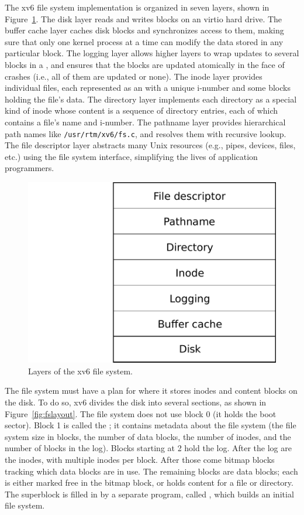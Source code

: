 The xv6 file system implementation is
organized in seven layers, shown in 
Figure~\ref{fig:fslayer}.
The disk layer reads and writes blocks on an virtio hard drive.
The buffer cache layer caches disk blocks and synchronizes access to them,
making sure that only one kernel process at a time can modify the
data stored in any particular block.  The logging layer allows higher
layers to wrap updates to several blocks in a
,
and ensures that the blocks are updated atomically in the
face of crashes (i.e., all of them are updated or none).
The inode layer provides individual files, each represented as an
with a unique i-number
and some blocks holding the file's data.  The directory
layer implements each directory as a special kind of
inode whose content is a sequence of directory entries, each of which contains a
file's name and i-number.
The pathname layer provides
hierarchical path names like
\lstinline{/usr/rtm/xv6/fs.c},
and resolves them with recursive lookup.
The file descriptor layer abstracts many Unix resources (e.g., pipes, devices,
files, etc.) using the file system interface, simplifying the lives of
application programmers.

\begin{figure}[t]
\center
\includegraphics[scale=0.5]{fig/fslayer.pdf}
\caption{Layers of the xv6 file system.}
\label{fig:fslayer}
\end{figure}

The file system must have a plan for where it stores inodes and
content blocks on the disk.
To do so, xv6 divides the disk into several
sections, as shown in 
Figure~\ref{fig:fslayout}.
The file system does not use
block 0 (it holds the boot sector).  Block 1 is called the 
; 
it contains metadata about the file system (the file system size in blocks, the
number of data blocks, the number of inodes, and the number of blocks in the
log).  Blocks starting at 2 hold the log.  After the log are the inodes, with multiple inodes per block.  After
those come bitmap blocks tracking which data blocks are in use.
The remaining blocks are data blocks; each is either marked
free in the bitmap block, or holds content for a file or directory.
The superblock is filled in by a separate program, called
,
which builds an initial file system.

